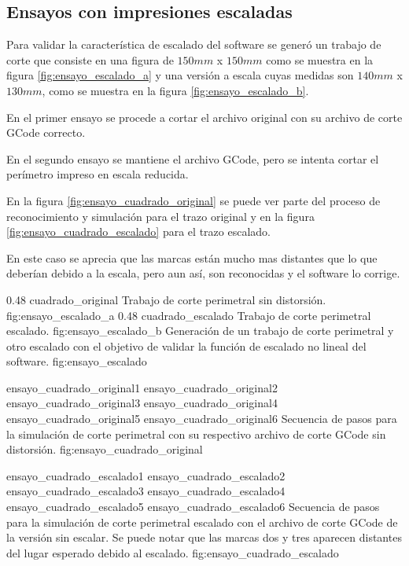 \subsection{Ensayos con impresiones escaladas}

Para validar la característica de escalado del software se generó un trabajo de corte que consiste en una figura de $150mm$ x $150mm$ como se muestra en la figura \ref{fig:ensayo_escalado_a} y una versión a escala cuyas medidas son $140mm$ x $130mm$, como se muestra en la figura \ref{fig:ensayo_escalado_b}.\par
   En el primer ensayo se procede a cortar el archivo original con su archivo de corte GCode correcto. \par
   En el segundo ensayo se mantiene el archivo GCode, pero se intenta cortar el perímetro impreso en escala reducida.\par
   En la figura \ref{fig:ensayo_cuadrado_original} se puede ver parte del proceso de reconocimiento y simulación para el trazo original y en la figura \ref{fig:ensayo_cuadrado_escalado} para el trazo escalado.\par
   En este caso se aprecia que las marcas están mucho mas distantes que lo que deberían debido a la escala, pero aun así, son reconocidas y el software lo corrige.

   \subfigab
   {0.48} {cuadrado_original} {Trabajo de corte perimetral sin distorsión.} {fig:ensayo_escalado_a}
   {0.48} {cuadrado_escalado} {Trabajo de corte perimetral escalado.} {fig:ensayo_escalado_b}
   {Generación de un trabajo de corte perimetral y otro escalado con el objetivo de validar la función de escalado no lineal del software. }
   {fig:ensayo_escalado}

   \subfigthreethree
      {ensayo_cuadrado_original1}
      {ensayo_cuadrado_original2}
      {ensayo_cuadrado_original3}
      {ensayo_cuadrado_original4}
      {ensayo_cuadrado_original5}
      {ensayo_cuadrado_original6}
      {Secuencia de pasos para la simulación de corte perimetral con su respectivo archivo de corte GCode sin distorsión.}
      {fig:ensayo_cuadrado_original}


   \subfigthreethree
      {ensayo_cuadrado_escalado1}
      {ensayo_cuadrado_escalado2}
      {ensayo_cuadrado_escalado3}
      {ensayo_cuadrado_escalado4}
      {ensayo_cuadrado_escalado5}
      {ensayo_cuadrado_escalado6}
      {Secuencia de pasos para la simulación de corte perimetral escalado con el archivo de corte GCode de la versión sin escalar. Se puede notar que las marcas dos y tres aparecen distantes del lugar esperado debido al escalado.}
      {fig:ensayo_cuadrado_escalado}


